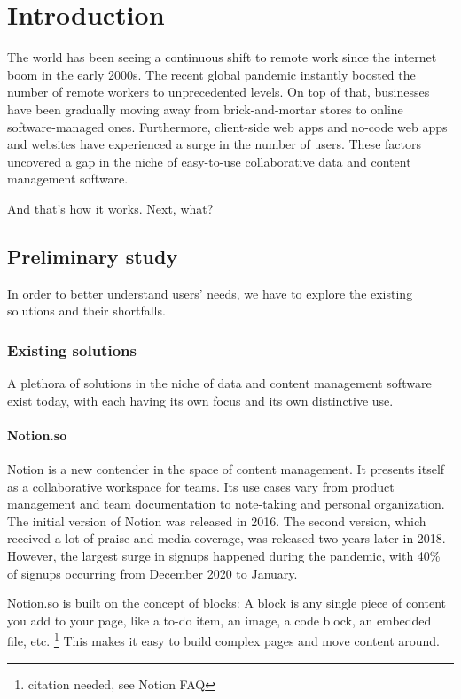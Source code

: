 \chapter{Introduction}
\label{chap:intro}

\noindent The world has been seeing a continuous shift to remote work since the
internet boom in the early 2000s. The recent global pandemic instantly
boosted the number of remote workers to unprecedented levels. On top of
that, businesses have been gradually moving away from brick-and-mortar
stores to online software-managed ones. Furthermore, client-side web
apps and no-code web apps and websites have experienced a surge in the
number of users. These factors uncovered a gap in the niche of
easy-to-use collaborative data and content management software.

And that's how it works. Next, what? \cite{Bringhurst12}

\section{Preliminary study}

In order to better understand users' needs, we have to explore the
existing solutions and their shortfalls.

\subsection{Existing solutions}

A plethora of solutions in the niche of data and content management
software exist today, with each having its own focus and its own
distinctive use.

\subsubsection{Notion.so}

Notion is a new contender in the space of content management. It
presents itself as a collaborative workspace for teams. Its use cases
vary from product management and team documentation to note-taking and
personal organization. The initial version of Notion was released in
2016. The second version, which received a lot of praise and media
coverage, was released two years later in 2018. However, the largest
surge in signups happened during the pandemic, with 40\% of signups
occurring from December 2020 to January.

Notion.so is built on the concept of blocks: A block is any single piece
of content you add to your page, like a to-do item, an image, a code
block, an embedded file, etc. \footnote{citation needed, see Notion FAQ}
This makes it easy to build complex pages and move content around.


